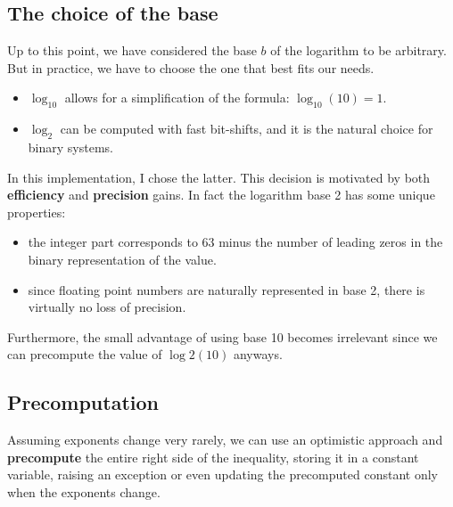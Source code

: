 \documentclass[11pt]{article}
\begin{document}
\subsection{The choice of the base}
Up to this point, we have considered the base $b$ of the logarithm to be arbitrary. But in practice, we have to choose the one that best fits our needs.
\begin{itemize}
    \item $\log_{10}$ allows for a simplification of the formula: $\log_{10}(10) = 1$.
    \item $\log_{2}$ can be computed with fast bit-shifts, and it is the natural choice for binary systems\textsuperscript{\cite{bithacks}}.
\end{itemize}
In this implementation, I chose the latter. This decision is motivated by both \textbf{efficiency} and \textbf{precision} gains. In fact the logarithm base 2 has some unique properties:
\begin{itemize}
    \item the integer part corresponds to 63 minus the number of leading zeros in the binary representation of the value.
    \item since floating point numbers are naturally represented in base 2, there is virtually no loss of precision.
\end{itemize}
Furthermore, the small advantage of using base 10 becomes irrelevant since we can precompute the value of $\log2(10)$ anyways.

\subsection{Precomputation}
Assuming exponents change very rarely, we can use an optimistic approach and \textbf{precompute} the entire right side of the inequality, storing it in a constant variable, raising an exception or even updating the precomputed constant only when the exponents change.
\end{document}
